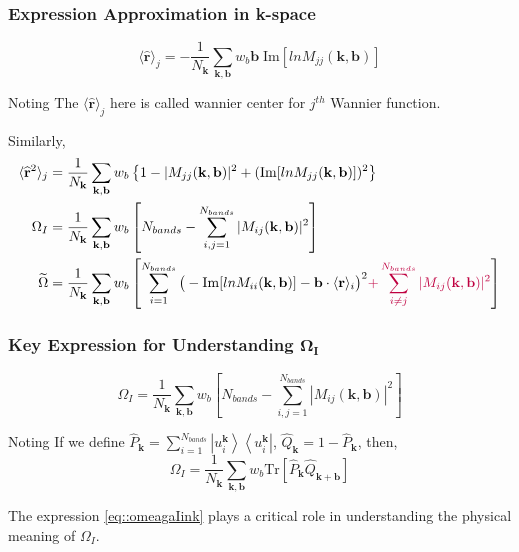 \documentclass{beamer}
\begin{document}
  \begin{frame}
    \small
    \frametitle{Expression Approximation in k-space}
    \begin{equation*}
        \langle\widehat{\mathbf{r}}\rangle_j = -\dfrac{1}{N_\mathbf{k}}\sum_{\mathbf{k},\mathbf{b}}w_b\mathbf{b}\;\mathrm{Im}[lnM_{jj}(\mathbf{k}, \mathbf{b})]
    \end{equation*}
    \begin{block}{Noting}
      The \(\langle\widehat{\mathbf{r}}\rangle_j\) here is called wannier center for \(j^{th}\) Wannier function. 
    \end{block}

    Similarly, 
    \begin{subequations}
      \begin{align}
        \langle\widehat{\mathbf{r}}^2\rangle_j &= \dfrac{1}{N_\mathbf{k}}\sum_{\mathbf{k},\mathbf{b}}w_b\left\{1-|M_{jj}(\mathbf{k},\mathbf{b})|^2+(\mathrm{Im}[lnM_{jj}(\mathbf{k},\mathbf{b})])^2\right\}\\
        \Omega_I &= \dfrac{1}{N_\mathbf{k}}\sum_{\mathbf{k},\mathbf{b}}w_b\left[N_{bands} - \sum_{i,j=1}^{N_{bands}}|M_{ij}(\mathbf{k},\mathbf{b})|^2\right]\\
        \widetilde{\Omega} &= \dfrac{1}{N_\mathbf{k}}\sum_{\mathbf{k},\mathbf{b}}w_b\left[{\color{black}\sum_{i=1}^{N_{bands}}\big(-\mathrm{Im}[lnM_{ii}(\mathbf{k},\mathbf{b})]-\mathbf{b}\cdot\langle\mathbf{r}\rangle_i\big)^2}{\color{purple}+\sum_{i\ne{}j}^{N_{bands}}|M_{ij}(\mathbf{k},\mathbf{b})|^2}\right]
      \end{align}
    \end{subequations}
  \end{frame}

  \begin{frame}
    \frametitle{Key Expression for Understanding \(\mathbf{\Omega_I}\)}
    \begin{equation*}
      \Omega_I = \dfrac{1}{N_\mathbf{k}}\sum_{\mathbf{k},\mathbf{b}}w_b\left[N_{bands} - \sum_{i,j=1}^{N_{bands}}|M_{ij}(\mathbf{k},\mathbf{b})|^2\right]
    \end{equation*}
    \begin{block}{Noting}
      If we define \(\widehat{P}_{\mathbf{k}} = \sum_{i=1}^{N_{bands}}\left|{}u_i^{\mathbf{k}}\right\rangle\left\langle{}u_i^{\mathbf{k}}\right|\), \(\widehat{Q}_{\mathbf{k}} = 1 - \widehat{P}_{\mathbf{k}}\), then, 
      \begin{equation}
        \label{eq::omeagaIink}
        \Omega_I = \dfrac{1}{N_\mathbf{k}}\sum_{\mathbf{k},\mathbf{b}}w_b{}\mathrm{Tr}\left[\widehat{P}_{\mathbf{k}}\widehat{Q}_{\mathbf{k}+\mathbf{b}} \right]
      \end{equation}

      The expression \eqref{eq::omeagaIink} plays a critical role in understanding the physical meaning of \(\Omega_I\).
    \end{block}
  \end{frame}
\end{document}
